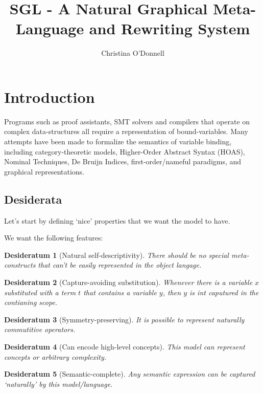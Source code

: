 \documentclass[a4paper,UKenglish,cleveref,autoref,thm-restate]{lipics-v2021}
\title{SGL - A Natural Graphical Meta-Language and Rewriting System}
\author{Christina O'Donnell}{Univerisity of Nottingham}{cdo@mutix.org}{}{}
\newtheorem{desideratum}{Desideratum}[theorem]
\begin{document}
\maketitle

\section{Introduction}
Programs such as proof assistants, SMT solvers and compilers that operate on
complex data-structures all require a representation of bound-variables. Many
attempts have been made to formalize the semantics of variable binding,
including category-theoretic models, Higher-Order Abstract Syntax (HOAS),
Nominal Techniques, De Bruijn Indices, first-order/nameful paradigms, and
graphical representations.

\subsection{Desiderata}
Let's start by defining `nice' properties that we want the model to have.

We want the following features:

\begin{desideratum}[Natural self-descriptivity]
\label{self-descriptivity}
There should be no special meta-constructs that can't be easily represented in
the object langage.
\end{desideratum}

\begin{desideratum}[Capture-avoiding substitution]
\label{capture-avoiding}
Whenever there is a variable $x$ substituted with a term $t$ that contains a
variable $y$, then $y$ is int caputured in the contianing scope.
\end{desideratum}

\begin{desideratum}[Symmetry-preserving]
\label{symmetry-preserving}
It is possible to represent naturally commutitive operators.
\end{desideratum}

\begin{desideratum}[Can encode high-level concepts]
\label{high-level}
This model can represent concepts or arbitrary complexity. 
\end{desideratum}

\begin{desideratum}[Semantic-complete]
\label{semantic-completeness}
Any semantic expression can be captured `naturally' by this model/language.
\end{desideratum}
\end{document}
